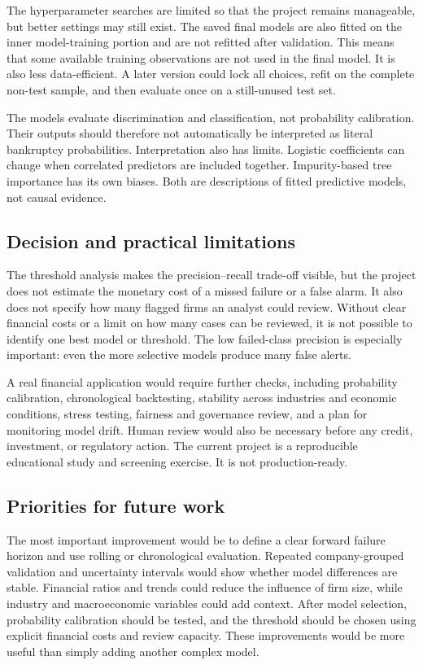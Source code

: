 \documentclass[11pt,a4paper]{article}
\begin{document}
The hyperparameter searches are limited so that the project remains manageable,
but better settings may still exist. The saved
final models are also fitted on the inner model-training portion and are not
refitted after validation. This means that some available training observations
are not used in the final model. It is also less data-efficient. A
later version could lock all choices, refit on the complete non-test sample, and
then evaluate once on a still-unused test set.

The models evaluate discrimination and classification, not probability
calibration. Their outputs should therefore not automatically be interpreted
as literal bankruptcy probabilities. Interpretation also has limits. Logistic
coefficients can change when correlated predictors are included together.
Impurity-based tree importance has its own biases. Both are descriptions of
fitted predictive models, not causal evidence.

\subsection{Decision and practical limitations}

The threshold analysis makes the precision--recall trade-off visible, but the
project does not estimate the monetary cost of a missed failure or a false
alarm. It also does not specify how many flagged firms an analyst could review.
Without clear financial costs or a limit on how many cases can be reviewed, it
is not possible to identify one best model or threshold. The low failed-class precision is especially
important: even the more selective models produce many false alerts.

A real financial application would require further checks, including
probability calibration, chronological backtesting, stability across industries
and economic conditions, stress testing, fairness and governance review, and a
plan for monitoring model drift. Human review would also be necessary before any
credit, investment, or regulatory action. The current project is a reproducible
educational study and screening exercise. It is not production-ready.

\subsection{Priorities for future work}

The most important improvement would be to define a clear forward failure
horizon and use rolling or chronological evaluation. Repeated company-grouped
validation and uncertainty intervals would show whether model differences are
stable. Financial ratios and trends could reduce the influence of firm size,
while industry and macroeconomic variables could add context. After model
selection, probability calibration should be tested, and the threshold should be
chosen using explicit financial costs and review capacity. These improvements
would be more useful than simply adding another complex model.
\end{document}

